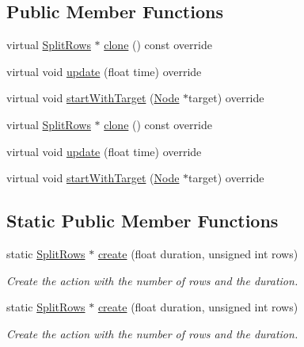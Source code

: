 \subsection*{Public Member Functions}
\begin{DoxyCompactItemize}
\item 
virtual \hyperlink{classSplitRows}{Split\+Rows} $\ast$ \hyperlink{classSplitRows_ad03535f13689bc0d79030170ce12f5ba}{clone} () const override
\item 
virtual void \hyperlink{classSplitRows_a38725e447edc1ccae1e0b9333192b346}{update} (float time) override
\item 
virtual void \hyperlink{classSplitRows_a46357d39bbf4e251086b42e4ad9ba9a1}{start\+With\+Target} (\hyperlink{classNode}{Node} $\ast$target) override
\item 
virtual \hyperlink{classSplitRows}{Split\+Rows} $\ast$ \hyperlink{classSplitRows_a48c66e4c45079a55377b9dfa5a018930}{clone} () const override
\item 
virtual void \hyperlink{classSplitRows_a4d9b103a86551824821990002c263f31}{update} (float time) override
\item 
virtual void \hyperlink{classSplitRows_a12d92df62d1f441371e4563fc3aa3196}{start\+With\+Target} (\hyperlink{classNode}{Node} $\ast$target) override
\end{DoxyCompactItemize}
\subsection*{Static Public Member Functions}
\begin{DoxyCompactItemize}
\item 
static \hyperlink{classSplitRows}{Split\+Rows} $\ast$ \hyperlink{classSplitRows_a9294734acb0eff668b1bec51b7b8ac5a}{create} (float duration, unsigned int rows)
\begin{DoxyCompactList}\small\item\em Create the action with the number of rows and the duration. \end{DoxyCompactList}\item 
static \hyperlink{classSplitRows}{Split\+Rows} $\ast$ \hyperlink{classSplitRows_a4e451beaa043480dae11975d9c5947e8}{create} (float duration, unsigned int rows)
\begin{DoxyCompactList}\small\item\em Create the action with the number of rows and the duration. \end{DoxyCompactList}\end{DoxyCompactItemize}
